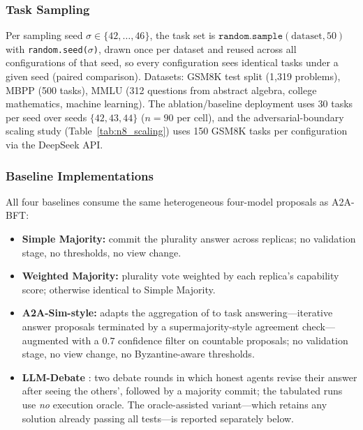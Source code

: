 \documentclass{article}
\begin{document}
\subsubsection{Task Sampling}
Per sampling seed $\sigma \in \{42,\dots,46\}$, the task set is $\texttt{random.sample}(\text{dataset}, 50)$ with \texttt{random.seed($\sigma$)}, drawn once per dataset and reused across all configurations of that seed, so every configuration sees identical tasks under a given seed (paired comparison). Datasets: GSM8K test split (1{,}319 problems), MBPP (500 tasks), MMLU (312 questions from abstract algebra, college mathematics, machine learning). The ablation/baseline deployment uses 30 tasks per seed over seeds $\{42,43,44\}$ ($n{=}90$ per cell), and the adversarial-boundary scaling study (Table~\ref{tab:n8_scaling}) uses 150 GSM8K tasks per configuration via the DeepSeek API.

\subsubsection{Baseline Implementations}
All four baselines consume the same heterogeneous four-model proposals as A2A-BFT:
\begin{itemize}
    \item \textbf{Simple Majority:} commit the plurality answer across replicas; no validation stage, no thresholds, no view change.
    \item \textbf{Weighted Majority:} plurality vote weighted by each replica's capability score; otherwise identical to Simple Majority.
    \item \textbf{A2A-Sim-style:} adapts the aggregation of \citet{a2a_sim_2026} to task answering---iterative answer proposals terminated by a supermajority-style agreement check---augmented with a $0.7$ confidence filter on countable proposals; no validation stage, no view change, no Byzantine-aware thresholds.
    \item \textbf{LLM-Debate} \citep{du2024improving}: two debate rounds in which honest agents revise their answer after seeing the others', followed by a majority commit; the tabulated runs use \emph{no} execution oracle. The oracle-assisted variant---which retains any solution already passing all tests---is reported separately below.
\end{itemize}
\end{document}
